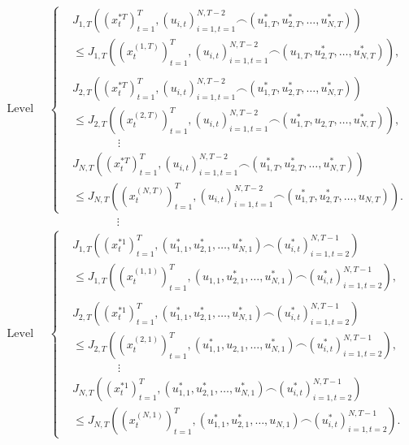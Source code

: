 \documentclass[letterpaper, 10 pt, conference]{ieeeconf}  %
\begin{document}
\begin{equation}
\label{eq:nashIneq}
    \begin{split}
        \text{Level T}
        &\begin{cases}
            &J_{1,T}((x_{t}^{*T})_{t=1}^{T}, (u_{i,t})_{i=1,t=1}^{N,T-2} \frown (u_{1,T}^{*},u_{2,T}^{*},\dots,u_{N,T}^{*})) \\ & \leq J_{1,T}((x_{t}^{(1,T)})_{t=1}^{T}, (u_{i,t})_{i=1,t=1}^{N,T-2} \frown (u_{1,T},u_{2,T}^{*},\dots,u_{N,T}^{*})),\\ \\
            &J_{2,T}((x_{t}^{*T})_{t=1}^{T}, (u_{i,t})_{i=1,t=1}^{N,T-2} \frown (u_{1,T}^{*},u_{2,T}^{*},\dots,u_{N,T}^{*})) \\ & \leq J_{2,T}((x_{t}^{(2,T)})_{t=1}^{T}, (u_{i,t})_{i=1,t=1}^{N,T-2} \frown (u_{1,T}^{*},u_{2,T},\dots,u_{N,T}^{*})),\\
            & \qquad \qquad \vdots \\
            &J_{N,T}((x_{t}^{*T})_{t=1}^{T}, (u_{i,t})_{i=1,t=1}^{N,T-2} \frown (u_{1,T}^{*},u_{2,T}^{*},\dots,u_{N,T}^{*})) \\ & \leq J_{N,T}((x_{t}^{(N,T)})_{t=1}^{T}, (u_{i,t})_{i=1,t=1}^{N,T-2} \frown (u_{1,T}^{*},u_{2,T}^{*},\dots,u_{N,T})).
        \end{cases}
    \\ &\qquad \qquad \qquad \vdots \\
    \text{Level 1}
        &\begin{cases}
            &J_{1,T}((x_{t}^{*1})_{t=1}^{T}, (u_{1,1}^{*},u_{2,1}^{*},\dots,u_{N,1}^{*}) \frown (u_{i,t}^{*})_{i=1,t=2}^{N,T-1}) \\ & \leq J_{1,T}((x_{t}^{(1,1)})_{t=1}^{T}, (u_{1,1},u_{2,1}^{*},\dots,u_{N,1}^{*}) \frown (u_{i,t}^{*})_{i=1,t=2}^{N,T-1}),\\ \\
            &J_{2,T}((x_{t}^{*1})_{t=1}^{T}, (u_{1,1}^{*},u_{2,1}^{*},\dots,u_{N,1}^{*}) \frown (u_{i,t}^{*})_{i=1,t=2}^{N,T-1}) \\ & \leq J_{2,T}((x_{t}^{(2,1)})_{t=1}^{T}, (u_{1,1}^{*},u_{2,1},\dots,u_{N,1}^{*}) \frown (u_{i,t}^{*})_{i=1,t=2}^{N,T-1}),\\
            & \qquad \qquad \vdots \\
            &J_{N,T}((x_{t}^{*1})_{t=1}^{T}, (u_{1,1}^{*},u_{2,1}^{*},\dots,u_{N,1}^{*}) \frown (u_{i,t}^{*})_{i=1,t=2}^{N,T-1}) \\ & \leq J_{N,T}((x_{t}^{(N,1)})_{t=1}^{T}, (u_{1,1}^{*},u_{2,1}^{*},\dots,u_{N,1}) \frown (u_{i,t}^{*})_{i=1,t=2}^{N,T-1}).
        \end{cases}
    \end{split}
\end{equation}
\end{document}
